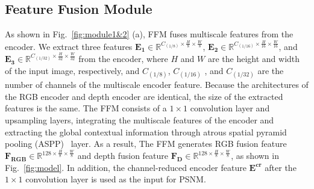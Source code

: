 \documentclass[runningheads]{llncs}
\begin{document}
	\subsection{Feature Fusion Module}
	As shown in Fig.~\ref{fig:module1&2} (a), FFM fuses multiscale features from the encoder. We extract three features $ \mathbf{E_1}  \in \mathbb{R} ^ {C_{ \left ( 1/8 \right )} \times \frac{ H } { 8 } \times \frac{ W } { 8 }}$, $ \mathbf{E_2}  \in \mathbb{R} ^ {C_{ \left ( 1/16 \right )} \times \frac{ H } { 16 } \times \frac{ W } { 16 }}$, and $ \mathbf{E_3} \in \mathbb{R} ^ {C_{ \left ( 1/32 \right )} \times \frac{ H } { 32 } \times \frac{ W } { 32 }}$ from the encoder, where $H$ and $W$ are the height and width of the input image, respectively, and $C_{ \left ( 1/8 \right )}$, $C_{ \left ( 1/16 \right )}$ , and $C_{ \left ( 1/32 \right )}$ are the number of channels of the multiscale encoder feature. Because the architectures of the RGB encoder and depth encoder are identical, the size of the extracted features is the same. The FFM consists of a $1 \times 1$ convolution layer and upsampling layers, integrating the multiscale features of the encoder and extracting the global contextual information through atrous spatial pyramid pooling (ASPP)~\cite{chen2017deeplab} layer. As a result, The FFM generates RGB fusion feature $\mathbf{F_{RGB}} \in \mathbb{R} ^ {128 \times \frac{ H } { 8 } \times \frac{ W } { 8 }}$ and depth fusion feature $\mathbf{F_D} \in \mathbb{R} ^ {128 \times \frac{ H } { 8 } \times \frac{ W } { 8 }}$, as shown in Fig.~\ref{fig:model}. In addition, the channel-reduced encoder feature $\mathbf{E^{cr}}$ after the $1 \times 1$ convolution layer is used as the input for PSNM.
	
\end{document}
